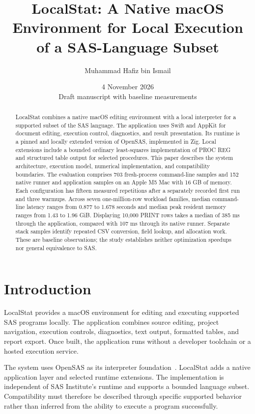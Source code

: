 \documentclass[11pt,a4paper]{article}
\title{LocalStat: A Native macOS Environment for Local
Execution of a SAS-Language Subset}
\author{Muhammad Hafiz bin Ismail}
\date{4 November 2026\\Draft manuscript with baseline measurements}
\begin{document}
\maketitle

\begin{abstract}
LocalStat combines a native macOS editing environment with a
local interpreter for a supported subset of the SAS language.
The application uses Swift and AppKit for document editing,
execution control, diagnostics, and result presentation. Its
runtime is a pinned and locally extended version of OpenSAS,
implemented in Zig. Local extensions include a bounded ordinary
least-squares implementation of PROC REG and structured table
output for selected procedures. This paper describes the system
architecture, execution model, numerical implementation, and
compatibility boundaries. The evaluation comprises 703
fresh-process command-line samples and 152 native runner and
application samples on an Apple M5 Mac with 16 GB of memory.
Each configuration has fifteen measured repetitions after a
separately recorded first run and three warmups. Across seven
one-million-row workload families, median command-line latency
ranges from 0.877 to 1.678 seconds and median peak resident
memory ranges from 1.43 to 1.96 GiB. Displaying 10,000 PRINT rows
takes a median of 385 ms through the application, compared with
107 ms through its native runner. Separate stack samples
identify repeated CSV conversion, field lookup, and allocation
work. These are baseline observations; the study establishes
neither optimization speedups nor general equivalence to SAS.
\end{abstract}

\section{Introduction}

LocalStat provides a macOS environment for editing and executing
supported SAS programs locally. The application combines source
editing, project navigation, execution controls, diagnostics,
text output, formatted tables, and report export. Once built,
the application runs without a developer toolchain or a hosted
execution service.

The system uses OpenSAS as its interpreter foundation~\cite{opensas}.
LocalStat adds a native application layer and
selected runtime extensions. The implementation is independent
of SAS Institute's runtime and supports a bounded language
subset. Compatibility must therefore be described through
specific supported behavior rather than inferred from the
ability to execute a program successfully.
\end{document}
